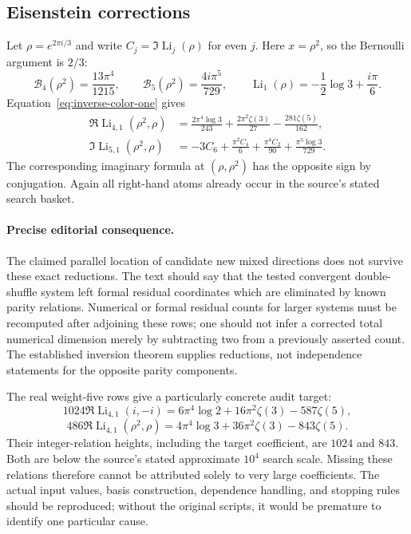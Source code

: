 \subsection{Eisenstein corrections}

Let $\rho=e^{2\pi i/3}$ and write
$C_j=\Im\operatorname{Li}_j(\rho)$ for even $j$.
Here $x=\rho^2$, so the Bernoulli argument is $2/3$:
\[
 \mathcal B_4(\rho^2)=\frac{13\pi^4}{1215},\qquad
 \mathcal B_5(\rho^2)=\frac{4i\pi^5}{729},\qquad
 \operatorname{Li}_1(\rho)=-\frac12\log3+\frac{i\pi}{6}.
\]
Equation~\eqref{eq:inverse-color-one} gives
\begin{align}
 \Re\operatorname{Li}_{4,1}(\rho^2,\rho)
  &=\frac{2\pi^4\log3}{243}+\frac{2\pi^2\zeta(3)}{27}
                           -\frac{281\zeta(5)}{162},
 \label{eq:eisenstein-mixed-real}\\
 \Im\operatorname{Li}_{5,1}(\rho^2,\rho)
  &=-3C_6+\frac{\pi^2C_4}{6}+\frac{\pi^4C_2}{90}
                         +\frac{\pi^5\log3}{729}.
 \label{eq:eisenstein-mixed-imag}
\end{align}
The corresponding imaginary formula at $(\rho,\rho^2)$ has the opposite
sign by conjugation. Again all right-hand atoms already occur in the
source's stated search basket.

\paragraph{Precise editorial consequence.}
The claimed parallel location of candidate new mixed directions does not
survive these exact reductions. The text should say that the tested
convergent double-shuffle system left formal residual coordinates which
are eliminated by known parity relations. Numerical or formal residual
counts for larger systems must be recomputed after adjoining these rows;
one should not infer a corrected total numerical dimension merely by
subtracting two from a previously asserted count. The established
inversion theorem supplies reductions, not independence statements for
the opposite parity components.

The real weight-five rows give a particularly concrete audit target:
\[
 1024\Re\operatorname{Li}_{4,1}(i,-i)
   =6\pi^4\log2+16\pi^2\zeta(3)-587\zeta(5),
\]
\[
 486\Re\operatorname{Li}_{4,1}(\rho^2,\rho)
   =4\pi^4\log3+36\pi^2\zeta(3)-843\zeta(5).
\]
Their integer-relation heights, including the target coefficient, are
$1024$ and $843$. Both are below the source's stated approximate
$10^4$ search scale. Missing these relations therefore cannot be
attributed solely to very large coefficients. The actual input values,
basis construction, dependence handling, and stopping rules should be
reproduced; without the original scripts, it would be premature to
identify one particular cause.

